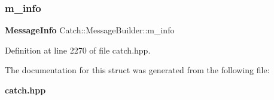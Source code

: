 \subsubsection{m\_info}
{\footnotesize\ttfamily \textbf{ Message\+Info} Catch\+::\+Message\+Builder\+::m\+\_\+info}



Definition at line 2270 of file catch.\+hpp.



The documentation for this struct was generated from the following file\+:\begin{DoxyCompactItemize}
\item 
\textbf{ catch.\+hpp}\end{DoxyCompactItemize}
